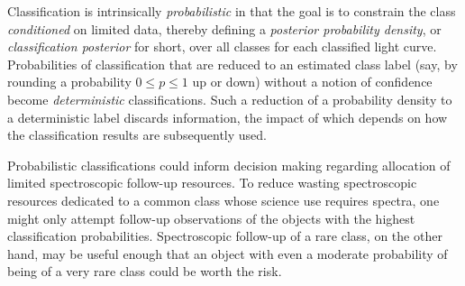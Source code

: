 Classification is intrinsically \textit{probabilistic} in that the goal is to constrain the class \textit{conditioned} on limited data, thereby defining a \textit{posterior probability density}, or \textit{classification posterior} for short, over all classes for each classified light curve.
Probabilities of classification that are reduced to an estimated class label (say, by rounding a probability $0 \leq p \leq 1$ up or down) without a notion of confidence become \textit{deterministic} classifications.
Such a reduction of a probability density to a deterministic label discards information, the impact of which depends on how the classification results are subsequently used.

Probabilistic classifications could inform decision making regarding allocation of limited spectroscopic follow-up resources.
To reduce wasting spectroscopic resources dedicated to a common class whose science use requires spectra, one might only attempt follow-up observations of the objects with the highest classification probabilities.
Spectroscopic follow-up of a rare class, on the other hand, may be useful enough that an object with even a moderate probability of being of a very rare class could be worth the risk.

